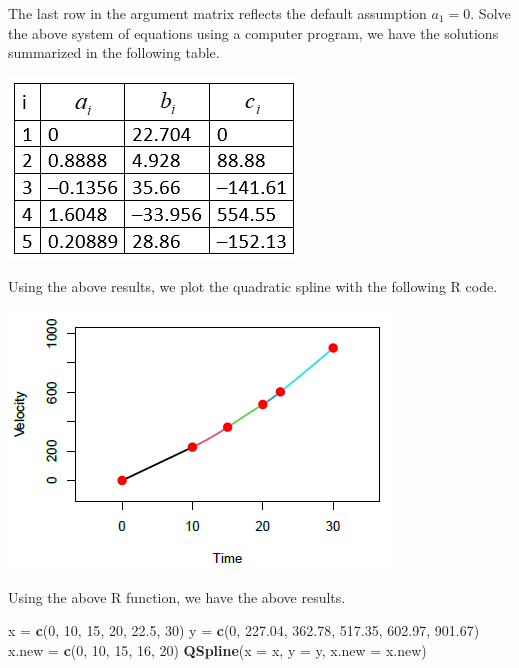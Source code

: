 \documentclass[
]{book}
\newenvironment{Shaded}{\begin{snugshade}}{\end{snugshade}}
\newcommand{\AttributeTok}[1]{\textcolor[rgb]{0.13,0.29,0.53}{#1}}
\newcommand{\DecValTok}[1]{\textcolor[rgb]{0.00,0.00,0.81}{#1}}
\newcommand{\FloatTok}[1]{\textcolor[rgb]{0.00,0.00,0.81}{#1}}
\newcommand{\FunctionTok}[1]{\textcolor[rgb]{0.13,0.29,0.53}{\textbf{#1}}}
\newcommand{\NormalTok}[1]{#1}
\newcommand{\OtherTok}[1]{\textcolor[rgb]{0.56,0.35,0.01}{#1}}
\begin{document}
The last row in the argument matrix reflects the default assumption \(a_1 = 0\). Solve the above system of equations using a computer program, we have the solutions summarized in the following table.

\begin{center}\includegraphics[width=0.25\linewidth]{img10/11-SolutionVelocityExample} \end{center}

Using the above results, we plot the quadratic spline with the following R code.

\begin{center}\includegraphics[width=0.45\linewidth]{img10/11-quadraticSplineCurveR} \end{center}

Using the above R function, we have the above results.

\begin{Shaded}
\begin{Highlighting}[]
\NormalTok{x }\OtherTok{=} \FunctionTok{c}\NormalTok{(}\DecValTok{0}\NormalTok{, }\DecValTok{10}\NormalTok{, }\DecValTok{15}\NormalTok{, }\DecValTok{20}\NormalTok{, }\FloatTok{22.5}\NormalTok{, }\DecValTok{30}\NormalTok{)}
\NormalTok{y }\OtherTok{=} \FunctionTok{c}\NormalTok{(}\DecValTok{0}\NormalTok{, }\FloatTok{227.04}\NormalTok{, }\FloatTok{362.78}\NormalTok{, }\FloatTok{517.35}\NormalTok{, }\FloatTok{602.97}\NormalTok{, }\FloatTok{901.67}\NormalTok{)}
\NormalTok{x.new }\OtherTok{=} \FunctionTok{c}\NormalTok{(}\DecValTok{0}\NormalTok{, }\DecValTok{10}\NormalTok{, }\DecValTok{15}\NormalTok{, }\DecValTok{16}\NormalTok{, }\DecValTok{20}\NormalTok{)}
\FunctionTok{QSpline}\NormalTok{(}\AttributeTok{x =}\NormalTok{ x, }\AttributeTok{y =}\NormalTok{ y, }\AttributeTok{x.new =}\NormalTok{ x.new)}
\end{Highlighting}
\end{Shaded}
\end{document}
